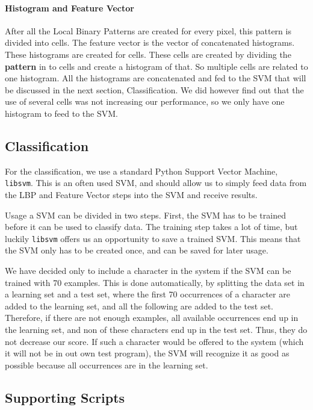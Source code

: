 \documentclass[a4paper]{article}
\begin{document}
\paragraph*{Histogram and Feature Vector}
After all the Local Binary Patterns are created for every pixel, this pattern
is divided into cells. The feature vector is the vector of concatenated
histograms. These histograms are created for cells. These cells are created by
dividing the \textbf{pattern} in to cells and create a histogram of that. So
multiple cells are related to one histogram. All the histograms are
concatenated and fed to the SVM that will be discussed in the next section,
Classification. We did however find out that the use of several cells was not
increasing our performance, so we only have one histogram to feed to the SVM.

\subsection{Classification}

For the classification, we use a standard Python Support Vector Machine,
\texttt{libsvm}. This is an often used SVM, and should allow us to simply feed
data from the LBP and Feature Vector steps into the SVM and receive results.



Usage a SVM can be divided in two steps. First, the SVM has to be trained
before it can be used to classify data. The training step takes a lot of time,
but luckily \texttt{libsvm} offers us an opportunity to save a trained SVM.
This means that the SVM only has to be created once, and can be saved for later
usage.

We have decided only to include a character in the system if the SVM can be
trained with 70 examples. This is done automatically, by splitting the data set
in a learning set and a test set, where the first 70 occurrences of a character
are added to the learning set, and all the following are added to the test set.
Therefore, if there are not enough examples, all available occurrences end up
in the learning set, and non of these characters end up in the test set. Thus,
they do not decrease our score. If such a character would be offered to the
system (which it will not be in out own test program), the SVM will recognize
it as good as possible because all occurrences are in the learning set.

\subsection{Supporting Scripts}
\end{document}
